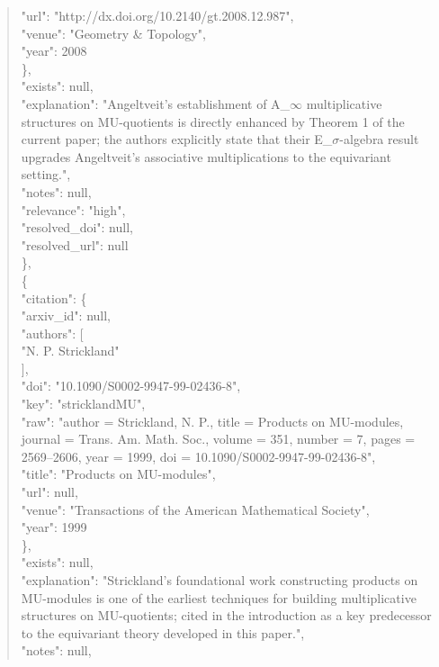 \documentclass[11pt]{article}
\begin{document}
\begin{quote}
        "url": "http://dx.doi.org/10.2140/gt.2008.12.987",\\
        "venue": "Geometry \& Topology",\\
        "year": 2008\\
      \},\\
      "exists": null,\\
      "explanation": "Angeltveit's establishment of A\_\ensuremath{\infty} multiplicative structures on MU-quotients is directly enhanced by Theorem 1 of the current paper; the authors explicitly state that their E\_\ensuremath{\sigma}-algebra result upgrades Angeltveit's associative multiplications to the equivariant setting.",\\
      "notes": null,\\
      "relevance": "high",\\
      "resolved\_doi": null,\\
      "resolved\_url": null\\
    \},\\
    \{\\
      "citation": \{\\
        "arxiv\_id": null,\\
        "authors": [\\
          "N. P. Strickland"\\
        ],\\
        "doi": "10.1090/S0002-9947-99-02436-8",\\
        "key": "stricklandMU",\\
        "raw": "author = Strickland, N. P., title = Products on MU-modules, journal = Trans. Am. Math. Soc., volume = 351, number = 7, pages = 2569--2606, year = 1999, doi = 10.1090/S0002-9947-99-02436-8",\\
        "title": "Products on MU-modules",\\
        "url": null,\\
        "venue": "Transactions of the American Mathematical Society",\\
        "year": 1999\\
      \},\\
      "exists": null,\\
      "explanation": "Strickland's foundational work constructing products on MU-modules is one of the earliest techniques for building multiplicative structures on MU-quotients; cited in the introduction as a key predecessor to the equivariant theory developed in this paper.",\\
      "notes": null,\\

\end{quote}
\end{document}
